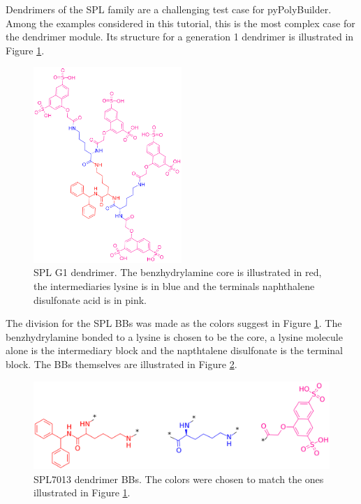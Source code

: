 
Dendrimers of the SPL family are a challenging test case for pyPolyBuilder.
Among the examples considered in this tutorial, this is the most complex case for the dendrimer module.
Its structure for a generation 1 dendrimer is illustrated in Figure \ref{fig:SPL7013G1}.

\begin{figure}
    \centering
    \includegraphics[width=0.5\textwidth]{SPL7013/SPL7013G1.png}
    \caption{SPL G1 dendrimer.
            The benzhydrylamine core is illustrated in red, the intermediaries lysine is in blue and the terminals naphthalene disulfonate acid is in pink.
             }
    \label{fig:SPL7013G1}
\end{figure}

The division for the SPL BBs was made as the colors suggest in Figure \ref{fig:SPL7013G1}.
The benzhydrylamine bonded to a lysine is chosen to be the core, a lysine molecule alone is the intermediary block and the napthtalene disulfonate is the terminal block.
The BBs themselves are illustrated in Figure \ref{fig:SPL7013BB}.

\begin{figure}
    \centering
    \includegraphics[width=\textwidth]{SPL7013/SPL7013BBs.png}
    \caption{SPL7013 dendrimer BBs.
             The colors were chosen to match the ones illustrated in Figure \ref{fig:SPL7013G1}.}
    \label{fig:SPL7013BB}
\end{figure}

